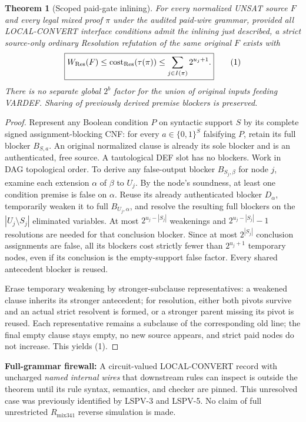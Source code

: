 \documentclass[11pt]{article}
\newtheorem{theorem}{Theorem}
\begin{document}
\begin{theorem}[Scoped paid-gate inlining]
For every normalized UNSAT source $F$ and every legal mixed proof $\pi$ under the audited paid-wire grammar, provided all LOCAL-CONVERT interface conditions admit the inlining just described, a strict source-only ordinary Resolution refutation of the \emph{same} original $F$ exists with
\[
\boxed{W_{\rm Res}(F)\le {\rm cost}_{\rm Res}(\tau(\pi))
 \le\sum_{j\in I(\pi)}2^{u_j+1}.}\tag{1}
\]
There is no separate global $2^b$ factor for the union of original inputs feeding VARDEF. Sharing of previously derived premise blockers is preserved.
\end{theorem}
\begin{proof}
Represent any Boolean condition $P$ on syntactic support $S$ by its complete signed assignment-blocking CNF: for every $a\in\{0,1\}^S$ falsifying $P$, retain its full blocker $B_{S,a}$. An original normalized clause is already its sole blocker and is an authenticated, free source. A tautological DEF slot has no blockers. Work in DAG topological order. To derive any false-output blocker $B_{S_j,\beta}$ for node $j$, examine each extension $\alpha$ of $\beta$ to $U_j$. By the node's soundness, at least one condition premise is false on $\alpha$. Reuse its already authenticated blocker $D_\alpha$, temporarily weaken it to full $B_{U_j,\alpha}$, and resolve the resulting full blockers on the $|U_j\setminus S_j|$ eliminated variables. At most $2^{u_j-|S_j|}$ weakenings and $2^{u_j-|S_j|}-1$ resolutions are needed for that conclusion blocker. Since at most $2^{|S_j|}$ conclusion assignments are false, all its blockers cost strictly fewer than $2^{u_j+1}$ temporary nodes, even if its conclusion is the empty-support false factor. Every shared antecedent blocker is reused.

Erase temporary weakening by stronger-subclause representatives: a weakened clause inherits its stronger antecedent; for resolution, either both pivots survive and an actual strict resolvent is formed, or a stronger parent missing its pivot is reused. Each representative remains a subclause of the corresponding old line; the final empty clause stays empty, no new source appears, and strict paid nodes do not increase. This yields (1).
\end{proof}

\noindent\textbf{Full-grammar firewall:} A circuit-valued LOCAL-CONVERT record with uncharged \emph{named internal wires} that downstream rules can inspect is outside the theorem until its rule syntax, semantics, and checker are pinned. This unresolved case was previously identified by LSPV-3 and LSPV-5. No claim of full unrestricted $R_{\mathrm{mix341}}$ reverse simulation is made.
\end{document}
